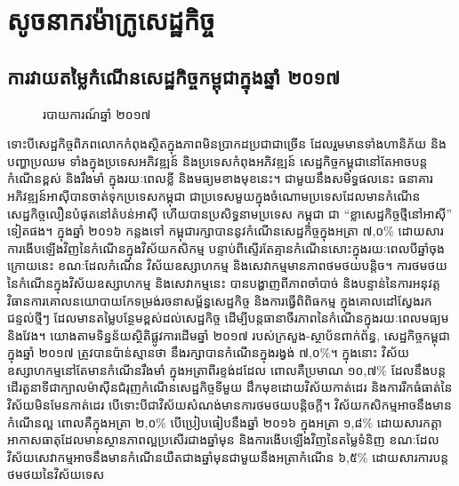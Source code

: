 \documentclass{maff}
\begin{document}
\frontmatter
\tableofcontents
\listoffigures
\listoftables
\mainmatter
{}
\chapter{សូចនាករម៉ាក្រូសេដ្ឋកិច្ច}
\section{ការវាយតម្លៃ​កំណើនសេដ្ឋកិច្ច​កម្ពុជា​ក្នុង​ឆ្នាំ ២០១៧}
\begin{figure}[H]
	\centering
	\caption{របាយការណ៍ឆ្នាំ ២០១៧}
\end{figure}
ទោះបី​សេដ្ឋកិច្ចពិភពលោក​កំពុងស្ថិត​ក្នុង​ភាពមិនប្រាកដប្រជា​ជាច្រើន ដែល​រួមមាន​ទាំង​ហានិភ័យ និង​បញ្ហា​ប្រឈម ទាំង​ក្នុងប្រទេស​អភិវឌ្ឍន៍ និង​ប្រទេស​កំពុងអភិវឌ្ឍន៍ សេដ្ឋកិច្ចកម្ពុជា​នៅតែ​អាច​បន្ត​កំណើន​ខ្ពស់ និង​រឹងមាំ ក្នុង​រយៈពេល​ខ្លី និង​មធ្យម​ខាងមុខនេះ។ ជាមួយនឹង​សមិទ្ធផល​នេះ ធនាគារ​អភិវឌ្ឍន៍អាស៊ី​បានចាត់ទុក​ប្រទេស​កម្ពុជា ជា​ប្រទេសមួយ​ក្នុងចំណោម​ប្រទេស​ដែលមាន​កំណើនសេដ្ឋកិច្ច​លឿន​បំផុត​នៅ​តំបន់​អាស៊ី ហើយ​បាន​ប្រសិទ្ធ​នាម​ប្រទេស កម្ពុជា ជា ``ខ្លា​សេដ្ឋកិច្ច​ថ្មី​នៅ​អាស៊ី'' ទៀតផង។ ក្នុង​ឆ្នាំ ២០១៦ កន្លងទៅ កម្ពុជា​រក្សាបាន​នូវ​កំណើនសេដ្ឋកិច្ច​ក្នុង​អត្រា ៧,០\% ដោយសារ​ការ​ងើបឡើង​វិញ​នៃ​កំណើន​ក្នុង​វិស័យ​កសិកម្ម បន្ទាប់ពី​ស្ទើរតែ​គ្មាន​កំណើន​សោះ​ក្នុង​រយៈពេល​បី​ឆ្នាំ​ចុងក្រោយ​នេះ ខណៈដែល​កំណើន វិស័យ​ឧស្សាហកម្ម និង​សេវាកម្ម​មាន​ភាព​ថមថយ​បន្តិច។ ការ​ថមថយ​នៃ​កំណើន​ក្នុង​វិស័យ​ឧស្សាហកម្ម និង​សេវាកម្ម​នេះ បានបង្ហាញ​ពី​ភាពចាំបាច់ និង​បន្ទាន់​នៃ​ការអនុវត្ត​វិធានការ​គោលនយោបាយ​កែទម្រង់​រចនាសម្ព័ន្ធ​សេដ្ឋកិច្ច និង​ការធ្វើ​ពិពិធកម្ម ក្នុង​គោលដៅ​ស្វែងរក​ជន្ទល់​ថ្មីៗ ដែលមាន​តម្លៃបន្ថែម​ខ្ពស់​ដល់​សេដ្ឋកិច្ច ដើម្បី​បន្ត​ធានា​ចីរភាព​នៃ​កំណើន​ក្នុង​រយៈពេល​មធ្យម និង​វែង។ យោងតាម​ទិន្នន័យ​ស្ថិតិ​ផ្លូវការ​ដើមឆ្នាំ ២០១៧ របស់​ក្រសួង-ស្ថាប័ន​ពាក់ព័ន្ធ, សេដ្ឋកិច្ចកម្ពុជា ក្នុង​ឆ្នាំ ២០១៧ ត្រូវបាន​ប៉ាន់ស្មាន​ថា នឹង​រក្សាបាន​កំណើន​ក្នុង​រង្វង់ ៧,០\%។ ក្នុងនោះ វិស័យ​ឧស្សាហកម្ម​នៅតែមាន​កំណើន​រឹងមាំ ក្នុង​អត្រា​ពីរ​ខ្ទង់​ដដែល ពោលគឺ​ប្រមាណ ១០,៧\% ដែល​នឹង​បន្ត​ដើរតួនាទី​ជា​ក្បាលម៉ាស៊ីន​ជំរុញ​កំណើនសេដ្ឋកិច្ច​ទីមួយ ដឹកមុខ​ដោយ​វិស័យ​កាត់ដេរ និង​ការរីក​ធំធាត់​នៃ​វិស័យ​មិនមែន​កាត់ដេរ បើទោះបីជា​វិស័យ​សំណង់​មានការ​ថមថយ​បន្តិច​ក្តី។ វិស័យ​កសិកម្ម​អាច​នឹងមាន​កំណើន​ល្អ ពោលគឺ​ក្នុង​អត្រា ២,០\% បើ​ប្រៀបធៀប​នឹង​ឆ្នាំ ២០១៦ ក្នុង​អត្រា ១,៨\% ដោយសារ​កត្តា​អាកាសធាតុ​ដែលមាន​ស្ថានភាព​ល្អប្រសើរ​ជាង​ឆ្នាំមុន និង​ការ​ងើបឡើង​វិញ​នៃ​តម្លៃ​ទំនិញ ខណៈដែល​វិស័យ​សេវាកម្ម​អាច​នឹងមាន​កំណើន​យឺត​ជាង​ឆ្នាំមុន​ជាមួយនឹង​អត្រាកំណើន ៦,៥\% ដោយសារ​ការបន្ត​ថមថយ​នៃ​វិស័យ​ទេស\\
\end{document}
